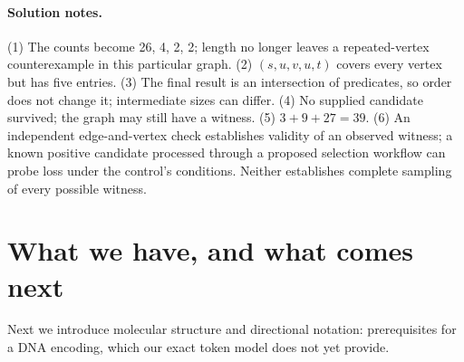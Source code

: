 \paragraph{Solution notes.}
(1) The counts become 26, 4, 2, 2; length no longer leaves a repeated-vertex
counterexample in this particular graph. (2) $(s,u,v,u,t)$ covers every vertex
but has five entries. (3) The final result is an intersection of predicates,
so order does not change it; intermediate sizes can differ. (4) No supplied
candidate survived; the graph may still have a witness. (5) $3+9+27=39$.
(6) An independent edge-and-vertex check establishes validity of an observed
witness; a known positive candidate processed through a proposed selection
workflow can probe loss under the control's conditions. Neither establishes
complete sampling of every possible witness.

\section*{What we have, and what comes next}
Next we introduce molecular structure and directional notation: prerequisites
for a DNA encoding, which our exact token model does not yet provide.
